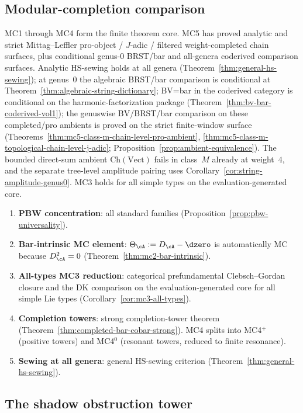 \subsection*{Modular-completion comparison}

MC1 through MC4 form the finite theorem core. MC5 has proved analytic
and strict Mittag--Leffler pro-object / $J$-adic /
filtered weight-completed chain surfaces, plus conditional genus-$0$
BRST/bar and all-genera coderived comparison surfaces. Analytic HS-sewing
holds at all genera (Theorem~\ref{thm:general-hs-sewing}); at genus~$0$
the algebraic BRST/bar comparison is conditional at
Theorem~\ref{thm:algebraic-string-dictionary}; BV=bar in the coderived
category is conditional on the harmonic-factorization package
(Theorem~\ref{thm:bv-bar-coderived-vol1}); the genuswise BV/BRST/bar
comparison on these completed/pro ambients is proved on the strict
finite-window surface
\textup{(}Theorems~\ref{thm:mc5-class-m-chain-level-pro-ambient},
\ref{thm:mc5-class-m-topological-chain-level-j-adic};
Proposition~\ref{prop:ambient-equivalence}\textup{)}. The bounded
direct-sum ambient $\mathrm{Ch}(\mathrm{Vect})$ fails in class~$M$
already at weight~$4$, and the separate tree-level amplitude pairing
uses Corollary~\ref{cor:string-amplitude-genus0}. MC3 holds for all
simple types on the evaluation-generated core.
\begin{enumerate}[label=\textbf{MC\arabic*},leftmargin=3em]
\item \textbf{PBW concentration}: all standard families
 (Proposition~\ref{prop:pbw-universality}).
\item \textbf{Bar-intrinsic MC element}: $\Theta_\cA := D_\cA - \dzero$
 is automatically MC because $D_\cA^2 = 0$
 (Theorem~\ref{thm:mc2-bar-intrinsic}).
\item \textbf{All-types MC3 reduction}: categorical prefundamental
 Clebsch--Gordan closure and the DK comparison on the
 evaluation-generated core for all simple Lie types
 (Corollary~\ref{cor:mc3-all-types}).
\item \textbf{Completion towers}: strong completion-tower theorem
 (Theorem~\ref{thm:completed-bar-cobar-strong}).
 MC4 splits into MC4$^+$ (positive towers) and
 MC4$^0$ (resonant towers, reduced to finite resonance).
\item \textbf{Sewing at all genera}: general HS-sewing criterion
 (Theorem~\ref{thm:general-hs-sewing}).
\end{enumerate}

\subsection*{The shadow obstruction tower}

